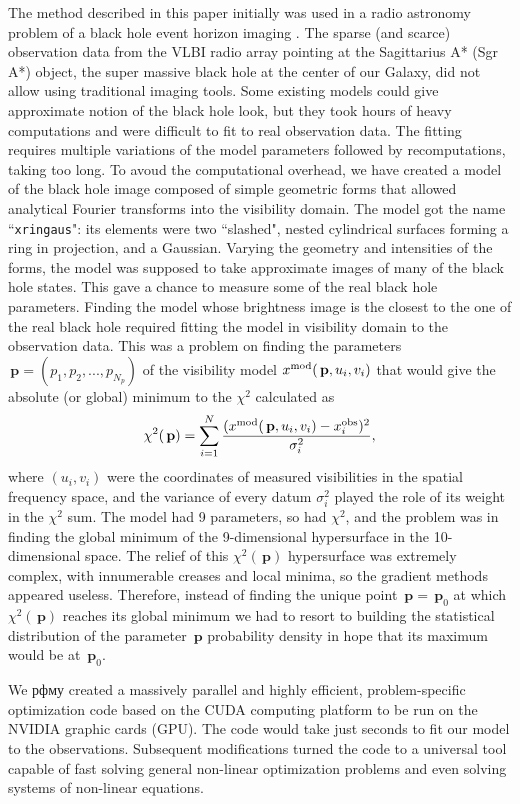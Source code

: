 \documentclass[preprint2]{aastex}
\newcommand{\bfp}{\,\mathbf{p}}
\begin{document}
The method described in this paper initially was used in a radio astronomy problem of a black hole event horizon imaging \citep{BenkevBHM}. The sparse (and scarce) observation data from the VLBI radio array pointing at the Sagittarius A* (Sgr A*) object, the super massive black hole at the center of our Galaxy, did not allow using traditional imaging tools. Some existing models could give approximate notion of the black hole look, but they took hours of heavy computations and were difficult to fit to real observation data. The fitting requires multiple variations of the model parameters followed by recomputations, taking too long. To avoud the computational overhead, we have created a model of the black hole image composed of simple geometric forms that allowed analytical Fourier transforms into the visibility domain. The model got the name ``\verb|xringaus|": its elements were two ``slashed", nested cylindrical surfaces forming a ring in projection, and a Gaussian. Varying the geometry and intensities of the forms, the model was supposed to take approximate images of many of the black hole states. This gave a chance to measure some of the real black hole parameters. Finding the model whose brightness image is the closest to the one of the real black hole required fitting the model in visibility domain to the observation data. This was a problem on finding the parameters $\bfp=(p_1,p_2,...,p_{N_p})$ of the visibility model $x^{\rm mod}(\bfp,u_i,v_i)$ that would give the absolute (or global) minimum to the $\chi^2$ calculated as
\begin{equation}
  \label{chi2}
  \chi^2(\bfp) = \sum_{i=1}^{N} \frac{(x^{\rm mod}(\bfp,u_i,v_i) - x_i^{\rm obs})^2}{\sigma_i^2},
\end{equation}
where $(u_i,v_i)$ were the coordinates of measured visibilities in the spatial frequency space, and the variance of every datum $\sigma_i^2$ played the role of its weight in the $\chi^2$ sum. The model had 9 parameters, so had $\chi^2$, and the problem was in finding the global minimum of the 9-dimensional hypersurface in the 10-dimensional space. The relief of this $\chi^2(\bfp)$ hypersurface was extremely complex, with innumerable creases and local minima, so the gradient methods appeared useless. Therefore, instead of finding the unique point $\bfp = \bfp_0$ at which $\chi^2(\bfp)$ reaches its global minimum we had to resort to building the statistical distribution of the parameter $\bfp$ probability density in hope that its maximum would be at $\bfp_0$. 

We рфму created a massively parallel and highly efficient, problem-specific optimization code based on the CUDA computing platform to be run on the NVIDIA graphic cards (GPU). The code would take just seconds to fit our model to the observations. Subsequent modifications turned the code to a universal tool capable of fast solving general non-linear optimization problems and even solving systems of non-linear equations. 
\end{document}
